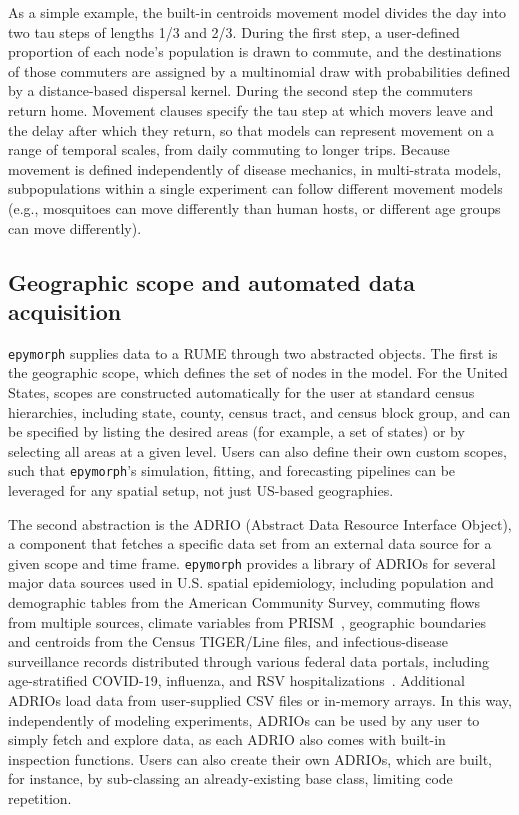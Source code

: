 As a simple example, the built-in centroids movement model divides the day into two tau steps of lengths 1/3 and 2/3. 
During the first step, a user-defined proportion of each node's population is drawn to commute, and the destinations of those commuters are assigned by a multinomial draw with probabilities defined by a distance-based dispersal kernel. 
During the second step the commuters return home.
Movement clauses specify the tau step at which movers leave and the delay after which they return, so that models can represent movement on a range of temporal scales, from daily commuting to longer trips. 
Because movement is defined independently of disease mechanics, in multi-strata models, subpopulations within a single experiment can follow different movement models (e.g., mosquitoes can move differently than human hosts, or different age groups can move differently).

\subsection{Geographic scope and automated data acquisition}

\texttt{epymorph} supplies data to a RUME through two abstracted objects. 
The first is the geographic scope, which defines the set of nodes in the model. 
For the United States, scopes are constructed automatically for the user at standard census hierarchies, including state, county, census tract, and census block group, and can be specified by listing the desired areas (for example, a set of states) or by selecting all areas at a given level. 
Users can also define their own custom scopes, such that \texttt{epymorph}'s simulation, fitting, and forecasting pipelines can be leveraged for any spatial setup, not just US-based geographies. 

The second abstraction is the ADRIO (Abstract Data Resource Interface Object), a component that fetches a specific data set from an external data source for a given scope and time frame.
\texttt{epymorph} provides a library of ADRIOs for several major data sources used in
U.S. spatial epidemiology, including population and demographic tables from the American Community Survey, commuting flows from multiple sources, climate variables from PRISM~\citep{noauthor_prism_nodate}, geographic boundaries and centroids from the Census TIGER/Line files, and infectious-disease surveillance records distributed through various federal data portals, including age-stratified COVID-19, influenza, and RSV hospitalizations~\citep{harris_array_2020,bureau_american_nodate,us_census_bureau_center_for_economic_studies_us_nodate,noauthor_prism_nodate}. 
Additional ADRIOs load data from user-supplied CSV files or in-memory arrays.
In this way, independently of modeling experiments, ADRIOs can be used by any user to simply fetch and explore data, as each ADRIO also comes with built-in inspection functions. 
Users can also create their own ADRIOs, which are built, for instance, by sub-classing an already-existing base class, limiting code repetition. 

